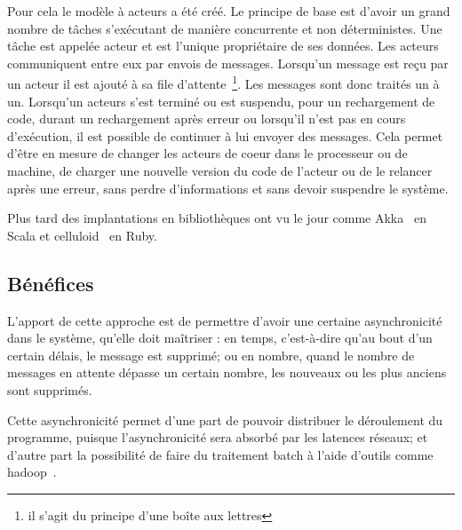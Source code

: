 \documentclass{article}
\begin{document}
Pour cela le modèle à acteurs a été créé. Le principe de base est d'avoir un grand
nombre de tâches s'exécutant de manière concurrente et non déterministes.
Une tâche est appelée acteur et est l'unique propriétaire de ses données.
Les acteurs communiquent entre eux par envois de messages.
Lorsqu'un message est reçu par un acteur il est ajouté à sa file d'attente~\footnote{il s'agit du principe d'une boîte aux lettres}.
Les messages sont donc traités un à un.
Lorsqu'un acteurs s'est terminé ou est suspendu, pour un rechargement de code, durant
un rechargement après erreur ou lorsqu'il n'est pas en cours d'exécution, il est possible
de continuer à lui envoyer des messages.
Cela permet d'être en mesure de changer les acteurs de coeur dans le processeur ou
de machine, de charger une nouvelle version du code de l'acteur ou de le relancer
après une erreur, sans perdre d'informations et sans devoir suspendre le système.

Plus tard des implantations en bibliothèques ont vu le jour comme Akka~\cite{akka}
en Scala et celluloid~\cite{celluloid} en Ruby.

\subsection{Bénéfices}\label{bénéfices}
L'apport de cette approche est de permettre d'avoir une certaine
asynchronicité dans le système, qu'elle doit maîtriser :
en temps, c'est-à-dire qu'au bout d'un certain délais, le message est supprimé;
ou en nombre, quand le nombre de messages en attente dépasse un certain nombre,
les nouveaux ou les plus anciens sont supprimés.

Cette asynchronicité permet d'une part de pouvoir distribuer le
déroulement du programme, puisque l'asynchronicité sera absorbé par les
latences réseaux; et d'autre part la possibilité de faire du traitement
batch à l'aide d'outils comme hadoop~\cite{hadoop}.
\end{document}
